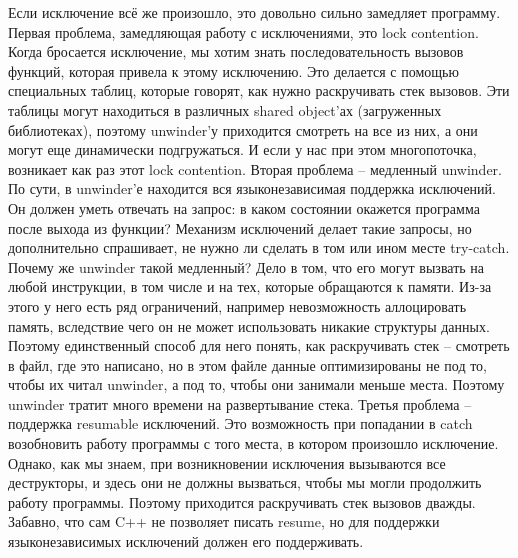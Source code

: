 \documentclass[12pt, a4paper]{article}
\begin{document}
	\par Если исключение всё же произошло, это довольно сильно замедляет программу. Первая проблема, замедляющая работу с исключениями, это lock contention. Когда бросается исключение, мы хотим знать последовательность вызовов функций, которая привела к этому исключению. Это делается с помощью специальных таблиц, которые говорят, как нужно раскручивать стек вызовов. Эти таблицы могут находиться в различных shared object'ах (загруженных библиотеках), поэтому unwinder'у приходится смотреть на все из них, а они могут еще динамически подгружаться. И если у нас при этом многопоточка, возникает как раз этот lock contention. Вторая проблема -- медленный unwinder. По сути, в unwinder'е находится вся языконезависимая поддержка исключений. Он должен уметь отвечать на запрос: в каком состоянии окажется программа после выхода из функции? Механизм исключений делает такие запросы, но дополнительно спрашивает, не нужно ли сделать в том или ином месте try-catch. Почему же unwinder такой медленный? Дело в том, что его могут вызвать на любой инструкции, в том числе и на тех, которые обращаются к памяти. Из-за этого у него есть ряд ограничений, например невозможность аллоцировать память, вследствие чего он не может использовать никакие структуры данных. Поэтому единственный способ для него понять, как раскручивать стек -- смотреть в файл, где это написано, но в этом файле данные оптимизированы не под то, чтобы их читал unwinder, а под то, чтобы они занимали меньше места. Поэтому unwinder тратит много времени на развертывание стека. Третья проблема -- поддержка resumable исключений. Это возможность при попадании в catch возобновить работу программы с того места, в котором произошло исключение. Однако, как мы знаем, при возникновении исключения вызываются все деструкторы, и здесь они не должны вызваться, чтобы мы могли продолжить работу программы. Поэтому приходится раскручивать стек вызовов дважды. Забавно, что сам C++ не позволяет писать resume, но для поддержки языконезависимых исключений должен его поддерживать.
\end{document}
